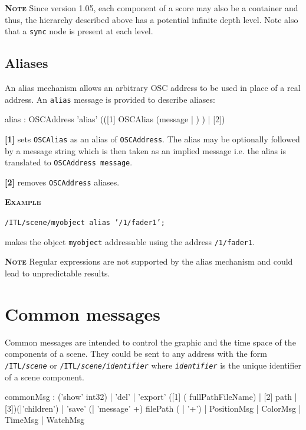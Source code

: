 \documentclass[a4paper,twoside]{report}
\newcommand{\toplevel}[1]	{\chapter{#1}}
\newcommand{\sublevel}[1]	{\section{#1}}
\newcommand{\OSC}[1]		{\texttt{#1}}
\newcommand{\example}		{\textbf{\hspace{-1.5cm}\textbf{\textsc{Example }}}}
\newcommand{\note}	[1]		{\vspace{2mm}\textbf{\hspace{-1.03cm}\textbf{\textsc{Note #1}}}}
\let\olditemize\itemize
\let\oldenditemize\enditemize
\renewenvironment{itemize} 	{\olditemize \setlength{\itemsep}{1mm}}{\oldenditemize}
\newcommand{\sample}	[1]			{\vspace{-2mm}\begin{center}\colorbox{mygrey}{
								\begin{minipage}[t]{0.9\columnwidth} 
								{\small \texttt{#1}}
								\end{minipage}}\end{center}}
\newcommand{\sampleindent}	{ \hspace{0.5cm} }
\begin{document}
\note{} Since version 1.05, each component of a score may also be a container and thus, the hierarchy described above has a potential infinite depth level. Note also that a \OSC{sync} node is present at each level. 


\sublevel{Aliases}
\label{alias}
An alias mechanism allows an arbitrary OSC address to be used in place of a real address. An \OSC{alias} message is provided to describe aliases: 
\begin{rail}
alias : OSCAddress 'alias' (([1] OSCAlias (message | ) ) | [2])
\end{rail}
\begin{itemize}
\item \textbf{[1]} sets \OSC{OSCAlias} as an alias of \OSC{OSCAddress}. The alias may be optionally followed by a message string which is then taken as an implied message i.e. the alias is translated to \OSC{OSCAddress message}.
\item \textbf{[2]} removes \OSC{OSCAddress} aliases.
\end{itemize}

\example
\sample{/ITL/scene/myobject alias '/1/fader1';}
\sampleindent makes the object \OSC{myobject} addressable using the address \OSC{/1/fader1}.

\note{} Regular expressions are not supported by the alias mechanism and could lead to unpredictable results.



\toplevel{Common messages}
\label{common}
Common messages are intended to control the graphic and the time space of the components of a scene.
They could be sent to any address with the form \OSC{/ITL/\textit{scene}} or \OSC{/ITL/\textit{scene}/\textit{identifier}} where \OSC{\textit{identifier}} is the unique identifier of a scene component.
\begin{rail}
commonMsg :  ('show' int32)
			| 'del'
			| 'export' ([1] ( fullPathFileName) | [2] path | [3])(|'children')
			| 'save' (| 'message' +) filePath ( | '+')
			| PositionMsg
			| ColorMsg
			| TimeMsg
			| WatchMsg
\end{rail}
\end{document}

